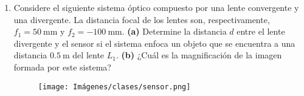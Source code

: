\documentclass[letterpaper,11pt]{article}
\begin{document}
\begin{enumerate}

\item Considere el siguiente sistema óptico compuesto por una lente convergente y una divergente. La distancia focal de los lentes son, respectivamente, $f_1=\SI{50}{\mm}$ y $f_2 = \SI{-100}{\mm}$. \textbf{(a)} Determine la distancia $d$ entre el lente divergente y el sensor si el sistema enfoca un objeto que se encuentra a una distancia $\SI{0.5}{\m}$ del lente $L_1$. \textbf{(b)} ¿Cuál es la magnificación de la imagen formada por este sistema?

\begin{figure}[H]
    \centering
    \texttt{[image: Imágenes/clases/sensor.png]}
\end{figure}

\end{enumerate}
\end{document}
